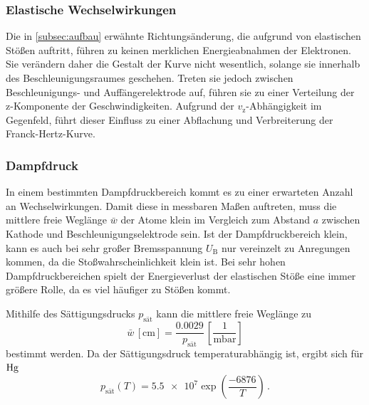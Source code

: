 \subsubsection{Elastische Wechselwirkungen}

Die in \autoref{subsec:aufbau} erwähnte Richtungsänderung, die aufgrund von elastischen Stößen auftritt,
führen zu keinen merklichen Energieabnahmen der Elektronen. 
Sie verändern daher die Gestalt der Kurve nicht wesentlich, solange sie innerhalb des Beschleunigungsraumes geschehen.
Treten sie jedoch zwischen Beschleunigungs- und Auffängerelektrode auf, führen sie zu einer Verteilung der z-Komponente der Geschwindigkeiten.
Aufgrund der $v_\text{z}$-Abhängigkeit im Gegenfeld, führt dieser Einfluss zu einer Abflachung und Verbreiterung der Franck-Hertz-Kurve.


\subsubsection{Dampfdruck}

In einem bestimmten Dampfdruckbereich kommt es zu einer erwarteten Anzahl an Wechselwirkungen.
Damit diese in messbaren Maßen auftreten, muss die mittlere freie Weglänge $\bar{w}$ der Atome klein im Vergleich
zum Abstand $a$ zwischen Kathode und Beschleunigungselektrode sein. 
Ist der Dampfdruckbereich klein, kann es auch bei sehr großer Bremsspannung $U_\text{B}$ nur vereinzelt zu Anregungen kommen, 
da die Stoßwahrscheinlichkeit klein ist. 
Bei sehr hohen Dampfdruckbereichen spielt der Energieverlust der elastischen Stöße eine immer größere Rolle, 
da es viel häufiger zu Stößen kommt.

Mithilfe des Sättigungsdrucks $p_\text{sät}$ kann die mittlere freie Weglänge zu
\begin{equation} \label{eq:druck1}
    \bar{w} \, [\unit{\centi\meter}] = \frac{0.0029}{p_\text{sät}} \, \left[ \frac{1}{\unit{\milli\bar}}\right]
\end{equation}
bestimmt werden.
Da der Sättigungsdruck temperaturabhängig ist, ergibt sich für $\ce{Hg}$ 
\begin{equation}
    p_\text{sät}(T) = \num{5.5e7} \exp{\left( \frac{-6876}{T} \right)} \, .
\end{equation}